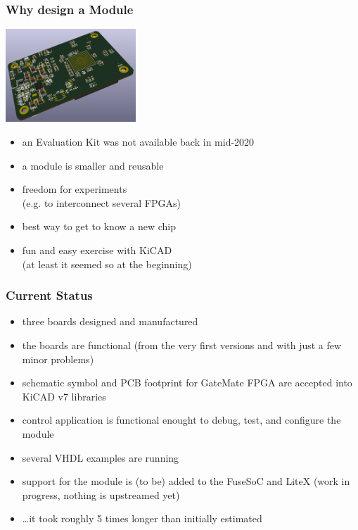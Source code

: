 \begin{frame}
  \frametitle{Why design a Module}

  \begin{flushright}
    \includegraphics[height=3.5cm]{GMM-7550_preview_2020-10-01.png}
  \end{flushright}
  \vspace{-4cm}

  \begin{minipage}{9cm}
  \begin{itemize}
    \item an Evaluation Kit was not available back in mid-2020
    \item a module is smaller and reusable
    \item freedom for experiments\\(e.g. to interconnect several FPGAs)
    \item best way to get to know a new chip
    \item fun and easy exercise with KiCAD\\(at least it seemed so at the beginning)
  \end{itemize}
  \end{minipage}

\end{frame}

\begin{frame}
  \frametitle{Current Status}
  \begin{itemize}
    \item three boards designed and manufactured
    \item the boards are functional (from the very first versions and
    with just a few minor problems)
    \item schematic symbol and PCB footprint for GateMate FPGA are accepted
    into KiCAD v7 libraries
    \item control application is functional enought to debug, test,
    and configure the module
    \item several VHDL examples are running
    \item support for the module is (to be) added to the FuseSoC and LiteX
    (work in progress, nothing is upstreamed yet)
    \item \dots it took roughly 5 times longer than initially estimated
  \end{itemize}
\end{frame}

